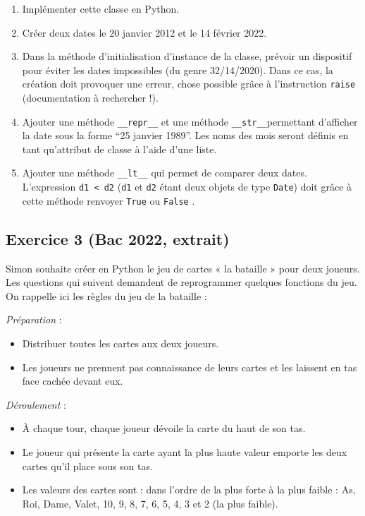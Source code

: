 \documentclass[
  a4paper,
  DIV=11,
  numbers=noendperiod]{scrartcl}
\providecommand{\tightlist}{%
  \setlength{\itemsep}{0pt}\setlength{\parskip}{0pt}}\usepackage{longtable,booktabs,array}
\begin{document}
\begin{enumerate}
\def\labelenumi{\arabic{enumi}.}
\tightlist
\item
  Implémenter cette classe en Python.
\item
  Créer deux dates le 20 janvier 2012 et le 14 février 2022.
\item
  Dans la méthode d'initialisation d'instance de la classe, prévoir un
  dispositif pour éviter les dates impossibles (du genre 32/14/2020).
  Dans ce cas, la création doit provoquer une erreur, chose possible
  grâce à l'instruction \texttt{raise} (documentation à rechercher !).
\item
  Ajouter une méthode \texttt{\_\_repr\_\_} et une méthode
  \texttt{\_\_str\_\_}permettant d'afficher la date sous la forme ``25
  janvier 1989''. Les noms des mois seront définis en tant qu'attribut
  de classe à l'aide d'une liste.
\item
  Ajouter une méthode \texttt{\_\_lt\_\_} qui permet de comparer deux
  dates. L'expression \texttt{d1\ \textless{}\ d2} (\texttt{d1} et
  \texttt{d2} étant deux objets de type \texttt{Date}) doit grâce à
  cette méthode renvoyer \texttt{True} ou \texttt{False} .
\end{enumerate}

\hypertarget{fa-solid-pencil-alt-exercice-3-bac-2022-extrait}{%
\subsection{\texorpdfstring{ Exercice 3 (Bac 2022,
extrait)}{ Exercice 3 (Bac 2022, extrait)}}\label{fa-solid-pencil-alt-exercice-3-bac-2022-extrait}}

Simon souhaite créer en Python le jeu de cartes « la bataille » pour
deux joueurs. Les questions qui suivent demandent de reprogrammer
quelques fonctions du jeu. On rappelle ici les règles du jeu de la
bataille :

\emph{Préparation} :

\begin{itemize}
\tightlist
\item
  Distribuer toutes les cartes aux deux joueurs.
\item
  Les joueurs ne prennent pas connaissance de leurs cartes et les
  laissent en tas face cachée devant eux.
\end{itemize}

\emph{Déroulement} :

\begin{itemize}
\tightlist
\item
  À chaque tour, chaque joueur dévoile la carte du haut de son tas.
\item
  Le joueur qui présente la carte ayant la plus haute valeur emporte les
  deux cartes qu'il place sous son tas.
\item
  Les valeurs des cartes sont : dans l'ordre de la plus forte à la plus
  faible : As, Roi, Dame, Valet, 10, 9, 8, 7, 6, 5, 4, 3 et 2 (la plus
  faible).
\end{itemize}
\end{document}
